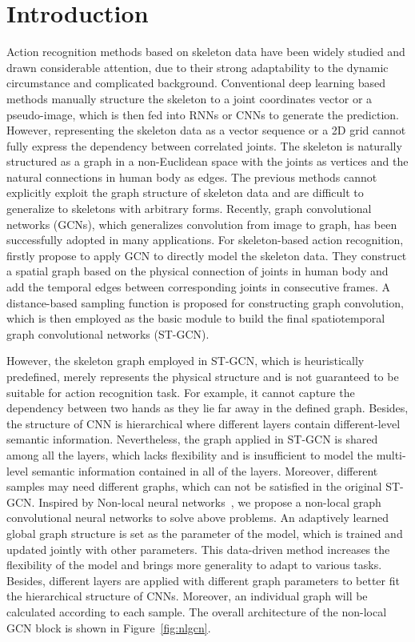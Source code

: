 \documentclass[10pt,twocolumn,letterpaper]{article}
\begin{document}
	\section{Introduction}	
    Action recognition methods based on skeleton data have been widely studied and drawn considerable attention, due to their strong adaptability to the dynamic circumstance and complicated background.
    Conventional deep learning based methods manually structure the skeleton to a joint coordinates vector or a pseudo-image, which is then fed into RNNs or CNNs to generate the prediction.
    However, representing the skeleton data as a vector sequence or a 2D grid cannot fully express the dependency between correlated joints. The skeleton is naturally structured as a graph in a non-Euclidean space with the joints as vertices and the natural connections in human body as edges. The previous methods cannot explicitly exploit the graph structure of skeleton data and are difficult to generalize to skeletons with arbitrary forms.
    Recently, graph convolutional networks (GCNs), which generalizes convolution from image to graph, has been successfully adopted in many applications. For skeleton-based action recognition, \cite{yan_spatial_2018} firstly propose to apply GCN to directly model the skeleton data. They construct a spatial graph based on the physical connection of joints in human body and add the temporal edges between corresponding joints in consecutive frames. A distance-based sampling function is proposed for constructing graph convolution, which is then employed as the basic module to build the final spatiotemporal graph convolutional networks (ST-GCN).

    However, the skeleton graph employed in ST-GCN, which is heuristically predefined, merely represents the physical structure and is not guaranteed to be suitable for action recognition task. For example, it cannot capture the dependency between two hands as they lie far away in the defined graph. Besides, the structure of CNN is hierarchical where different layers contain different-level semantic information. Nevertheless, the graph applied in ST-GCN is shared among all the layers, which lacks flexibility and is insufficient to model the multi-level semantic information contained in all of the layers. Moreover, different samples may need different graphs, which can not be satisfied in the original ST-GCN.
   	Inspired by Non-local neural networks~\cite{wang_non-local_2017}, we propose a non-local graph convolutional neural networks to solve above problems. An adaptively learned global graph structure is set as the parameter of the model, which is trained and updated jointly with other parameters. This data-driven method increases the flexibility of the model and brings more generality to adapt to various tasks. Besides, different layers are applied with different graph parameters to better fit the hierarchical structure of CNNs. Moreover, an individual graph will be calculated according to each sample. The overall architecture of the non-local GCN block is shown in Figure~\ref{fig:nlgcn}.
    
\end{document}
